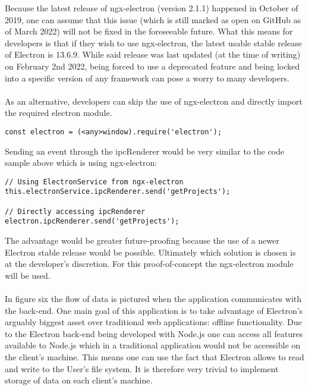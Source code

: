 Because the latest release of ngx-electron (version 2.1.1) happened in October of 2019, one can 
assume that this issue (which is still marked as open on GitHub as of March 2022) will not be fixed in 
the foreseeable future. \parencite{namespaceError}
What this means for developers is that if they wish to use ngx-electron, the latest usable stable release
of Electron is 13.6.9. 
While said release was last updated (at the time of writing) on February 2nd 2022, being forced to use
a deprecated feature and being locked into a specific version of any framework can pose a worry to 
many developers. \paragraph{}
As an alternative, developers can skip the use of ngx-electron and directly import the required electron module.
\begin{lstlisting}[caption=Requiring Electron in Angular]
const electron = (<any>window).require('electron');
\end{lstlisting}
Sending an event through the ipcRenderer would be very similar to the code sample above which is using 
ngx-electron:
\begin{lstlisting}[caption=Sending an event through ipcRenderer]
// Using ElectronService from ngx-electron
this.electronService.ipcRenderer.send('getProjects');

// Directly accessing ipcRenderer
electron.ipcRenderer.send('getProjects');
\end{lstlisting}
The advantage would be greater future-proofing because the use of a newer Electron stable release would
be possible.
Ultimately which solution is chosen is at the developer's discretion. 
For this proof-of-concept the ngx-electron module will be used.\paragraph{}
In figure six the flow of data is pictured when the application communicates with
the back-end.
One main goal of this application is to take advantage of Electron's arguably biggest asset over 
traditional web applications: offline functionality.
Due to the Electron back-end being developed with Node.js one can access all features available to Node.js 
which in a traditional application would not be accessible on the client's machine.
This means one can use the fact that Electron allows to read and write to the User's file system. 
It is therefore very trivial to implement storage of data on each client's machine.  
